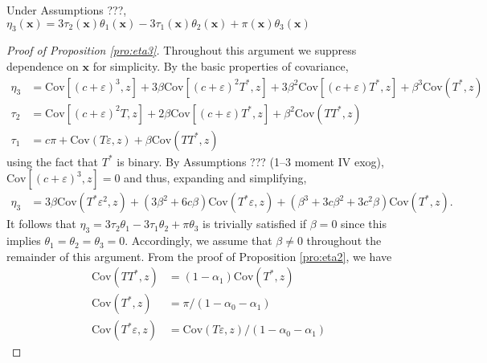 \documentclass[12pt]{article}
\begin{document}
\begin{pro}
  Under Assumptions ???, $\eta_3(\mathbf{x}) =  3\tau_2(\mathbf{x}) \theta_1(\mathbf{x}) - 3\tau_1(\mathbf{x}) \theta_2(\mathbf{x}) + \pi(\mathbf{x})\theta_3(\mathbf{x})$
  \label{pro:eta3}
\end{pro}
\begin{proof}[Proof of Proposition \ref{pro:eta3}]
  Throughout this argument we suppress dependence on $\mathbf{x}$ for simplicity.
  By the basic properties of covariance,
\begin{align*}
  \eta_3 &= \mbox{Cov}\left[ (c + \varepsilon)^3,z \right] + 3 \beta \mbox{Cov}[(c + \varepsilon)^2 T^*, z] + 3 \beta^2 \mbox{Cov}[(c + \varepsilon)T^*,z] + \beta^3 \mbox{Cov}(T^*,z)\\
  \tau_2 &= \mbox{Cov}\left[ (c + \varepsilon)^2 T, z \right] + 2 \beta \mbox{Cov}\left[ (c + \varepsilon)T^*,z \right] + \beta^2 \mbox{Cov}(TT^*,z)\\
  \tau_1 &= c\pi + \mbox{Cov}(T\varepsilon,z) + \beta\mbox{Cov}(TT^*,z)
\end{align*}
using the fact that $T^*$ is binary.
By Assumptions ??? (1--3 moment IV exog), $\mbox{Cov}\left[ (c + \varepsilon)^3,z \right] = 0$ and thus, expanding and simplifying,
\begin{align*}
  \eta_3 %
  &= 3 \beta \mbox{Cov}(T^*\varepsilon^2,z) + \left(3 \beta^2 + 6c\beta \right)\mbox{Cov}(T^*\varepsilon,z) + \left( \beta^3 + 3c\beta^2 + 3c^2\beta \right)\mbox{Cov}(T^*, z).
\end{align*}
It follows that $\eta_3 = 3\tau_2 \theta_1 - 3 \tau_1 \theta_2 + \pi \theta_3$ is trivially satisfied if $\beta = 0$ since this implies $\theta_1 = \theta_2 = \theta_3 = 0$.
Accordingly, we assume that $\beta \neq 0$ throughout the remainder of this argument.
From the proof of Proposition \ref{pro:eta2}, we have
\begin{align*}
  \mbox{Cov}(TT^*,z) &= (1 - \alpha_1) \mbox{Cov}(T^*,z)\\ 
  \mbox{Cov}(T^*,z) &= \pi / (1 - \alpha_0 - \alpha_1)\\
  \mbox{Cov}(T^*\varepsilon,z) &= \mbox{Cov}(T\varepsilon,z) / (1 - \alpha_0 - \alpha_1)
\end{align*}


\end{proof}
\end{document}
